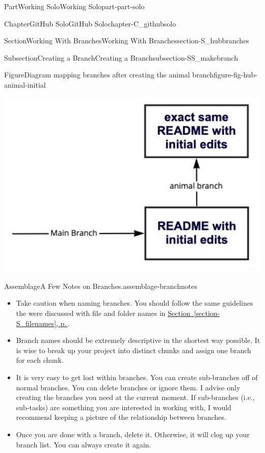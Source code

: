 \documentclass[twoside,10pt,]{book}
\newcommand{\xreffont}{\relax}
\begin{document}
\begin{partptx}{Part}{Working Solo}{}{Working Solo}{}{}{part-part-solo}
\begin{chapterptx}{Chapter}{GitHub Solo}{}{GitHub Solo}{}{}{chapter-C_githubsolo}
\begin{sectionptx}{Section}{Working With Branches}{}{Working With Branches}{}{}{section-S_hubbranches}
\begin{subsectionptx}{Subsection}{Creating a Branch}{}{Creating a Branch}{}{}{subsection-SS_makebranch}
\begin{figureptx}{Figure}{Diagram mapping branches after creating the animal branch}{figure-fig-hub-animal-initial}{}
\begin{image}{0.15}{0.7}{0.15}{}
\includegraphics[width=\linewidth]{external/hub_animal_initial.pdf}
\end{image}%
\tcblower
\end{figureptx}%
\begin{assemblage}{Assemblage}{A Few Notes on Branches.}{assemblage-branchnotes}%
%
\begin{itemize}[label=\textbullet]
\item{}Take caution when naming branches. You should follow the same guidelines the were discussed with file and folder names in \hyperref[section-S_filenames]{Section~{\xreffont\ref{section-S_filenames}}, p.\,\pageref{section-S_filenames}}.%
\item{}Branch names should be extremely descriptive in the shortest way possible. It is wise to break up your project into distinct chunks and assign one branch for each chunk.%
\item{}It is very easy to get lost within branches. You can create sub-branches off of normal branches. You can delete branches or ignore them. I advise only creating the branches you need at the current moment. If sub-branches (i.e., sub-tasks) are something you are interested in working with, I would recommend keeping a picture of the relationship between branches.%
\item{}Once you are done with a branch, delete it. Otherwise, it will clog up your branch list. You can always create it again.%
\end{itemize}
%
\end{assemblage}
\end{subsectionptx}
%
%
\typeout{************************************************}

\end{sectionptx}
\end{chapterptx}
\end{partptx}
\end{document}
